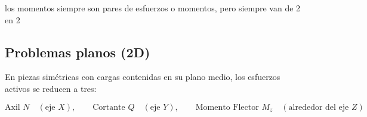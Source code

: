 los momentos siempre son pares de esfuerzos o momentos, pero siempre van de 2 en 2

\subsection{Problemas planos (2D)}

En piezas simétricas con cargas contenidas en su plano medio, los esfuerzos activos se reducen a tres:

\begin{equation}

    \text{Axil } N \quad (\text{eje } X), \qquad \text{Cortante } Q \quad (\text{eje } Y), \qquad \text{Momento Flector } M_z \quad (\text{alrededor del eje } Z)

\end{equation}



